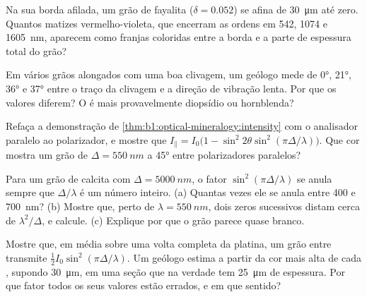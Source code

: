 \begin{exercise}[$\star\star$]\label{exo:b1:optical-mineralogy:8}
Na sua borda afilada, um grão de fayalita ($\delta = 0.052$) se afina de \qty{30}{\micro m} até zero. Quantos matizes vermelho-violeta, que encerram as ordens em 542, 1074 e \qty{1605}{nm}, aparecem como franjas coloridas entre a borda e a parte de espessura total do grão?
\end{exercise}

\begin{exercise}[$\star\star$]\label{exo:b1:optical-mineralogy:9}
Em vários grãos alongados com uma boa clivagem, um geólogo mede  de \ang{0}, \ang{21}, \ang{36} e \ang{37} entre o traço da clivagem e a direção de vibração lenta. Por que os valores diferem? O  é mais provavelmente diopsídio ou hornblenda?
\end{exercise}

\begin{exercise}[$\star\star\star$]\label{exo:b1:optical-mineralogy:10}
Refaça a demonstração de \cref{thm:b1:optical-mineralogy:intensity} com o analisador paralelo ao polarizador, e mostre que
$I_\parallel = I_0\bigl(1 - \sin^2 2\theta\sin^2(\pi\Delta/\lambda)\bigr)$.
Que cor mostra um grão de $\Delta = \qty{550}{nm}$ a \ang{45} entre polarizadores paralelos?
\end{exercise}

\begin{exercise}[$\star\star\star$]\label{exo:b1:optical-mineralogy:11}
Para um grão de calcita com $\Delta = \qty{5000}{nm}$, o fator
$\sin^2(\pi\Delta/\lambda)$ se anula sempre que $\Delta/\lambda$ é um número inteiro. (a) Quantas vezes ele se anula entre \num{400} e \qty{700}{nm}? (b) Mostre que, perto de $\lambda = \qty{550}{nm}$, dois zeros sucessivos distam cerca de $\lambda^2/\Delta$, e calcule. (c) Explique por que o grão parece quase branco.
\end{exercise}

\begin{exercise}[$\star\star\star$]\label{exo:b1:optical-mineralogy:12}
Mostre que, em média sobre uma volta completa da platina, um grão entre  transmite $\frac12 I_0\sin^2(\pi\Delta/\lambda)$. Um geólogo estima  a partir da cor mais alta de cada , supondo \qty{30}{\micro m}, em uma seção que na verdade tem \qty{25}{\micro m} de espessura. Por que fator todos os seus valores estão errados, e em que sentido?
\end{exercise}

